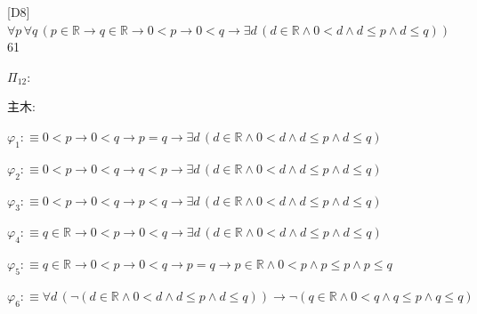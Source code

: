 \begin{fullproof}{[D8]}{$\forall p\,\forall q\,(p \in \mathbb{R} \to q \in \mathbb{R} \to 0 < p \to 0 < q \to \exists d\,(d \in \mathbb{R} \land 0 < d \land d \leq p \land d \leq q))$}{61}
\begin{ptree}
\end{ptree}
\noindent$\Pi_{12}$:
\begin{ptree}
\noLine
{}
\noLine
{}
\noLine
{}
\end{ptree}
\noindent 主木:
\begin{ptree}
\noLine
{}
\noLine
{}
\end{ptree}
\begin{abbrevlist}
\item $\varphi_{1} :\equiv 0 < p \to 0 < q \to p = q \to \exists d\,(d \in \mathbb{R} \land 0 < d \land d \leq p \land d \leq q)$
\item $\varphi_{2} :\equiv 0 < p \to 0 < q \to q < p \to \exists d\,(d \in \mathbb{R} \land 0 < d \land d \leq p \land d \leq q)$
\item $\varphi_{3} :\equiv 0 < p \to 0 < q \to p < q \to \exists d\,(d \in \mathbb{R} \land 0 < d \land d \leq p \land d \leq q)$
\item $\varphi_{4} :\equiv q \in \mathbb{R} \to 0 < p \to 0 < q \to \exists d\,(d \in \mathbb{R} \land 0 < d \land d \leq p \land d \leq q)$
\item $\varphi_{5} :\equiv q \in \mathbb{R} \to 0 < p \to 0 < q \to p = q \to p \in \mathbb{R} \land 0 < p \land p \leq p \land p \leq q$
\item $\varphi_{6} :\equiv \forall d\,(\neg (d \in \mathbb{R} \land 0 < d \land d \leq p \land d \leq q)) \to \neg (q \in \mathbb{R} \land 0 < q \land q \leq p \land q \leq q)$

\end{abbrevlist}
\end{fullproof}
